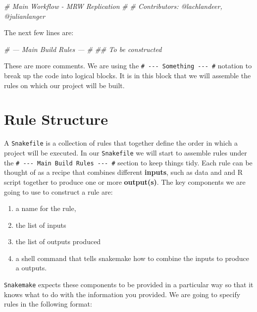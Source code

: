 \documentclass[]{book}
\newenvironment{Shaded}{\begin{snugshade}}{\end{snugshade}}
\newcommand{\CommentTok}[1]{\textcolor[rgb]{0.56,0.35,0.01}{\textit{{#1}}}}
\providecommand{\tightlist}{%
  \setlength{\itemsep}{0pt}\setlength{\parskip}{0pt}}
\theoremstyle{definition}
\theoremstyle{definition}
\theoremstyle{definition}
\theoremstyle{remark}
\begin{document}
\begin{Shaded}
\begin{Highlighting}[]
\CommentTok{# Main Workflow - MRW Replication}
\CommentTok{#}
\CommentTok{# Contributors: @lachlandeer, @julianlanger}
\end{Highlighting}
\end{Shaded}

The next few lines are:

\begin{Shaded}
\begin{Highlighting}[]
\CommentTok{# --- Main Build Rules --- #}
\CommentTok{## To be constructed}
\end{Highlighting}
\end{Shaded}

These are more comments. We are using the
\texttt{\#\ -\/-\/-\ Something\ -\/-\/-\ \#} notation to break up the
code into logical blocks. It is in this block that we will assemble the
rules on which our project will be built.

\section{Rule Structure}\label{rule-structure}

A \texttt{Snakefile} is a collection of rules that together define the
order in which a project will be executed. In our \texttt{Snakefile} we
will start to assemble rules under the
\texttt{\#\ -\/-\/-\ Main\ Build\ Rules\ -\/-\/-\ \#} section to keep
things tidy. Each rule can be thought of as a recipe that combines
different \textbf{inputs}, such as data and and R script together to
produce one or more \textbf{output(s)}. The key components we are going
to use to construct a rule are:

\begin{enumerate}
\def\labelenumi{(\roman{enumi})}
\tightlist
\item
  a name for the rule,
\item
  the list of inputs
\item
  the list of outputs produced
\item
  a shell command that tells snakemake how to combine the inputs to
  produce a outputs.
\end{enumerate}

\texttt{Snakemake} expects these components to be provided in a
particular way so that it knows what to do with the information you
provided. We are going to specify rules in the following format:
\end{document}
